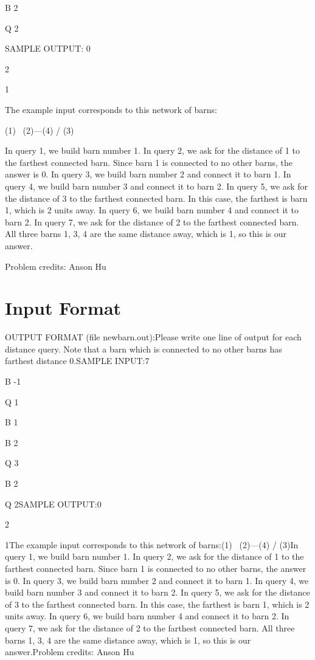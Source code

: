 \documentclass[12pt]{article}
\begin{document}
B 2

Q 2

SAMPLE OUTPUT: 
0

2

1


The example input corresponds to this network of barns:


  (1) 
    \   
     (2)---(4)
    /
  (3)

In query 1, we build barn number 1. In query 2, we ask for the distance of 1 to
the farthest connected barn. Since barn 1 is connected to no other barns, the
answer is 0. In query 3, we build barn number 2 and connect it to barn 1. In
query 4, we build barn number 3 and connect it to barn 2. In query 5, we ask for
the distance of 3 to the farthest connected barn. In this case, the farthest is
barn 1, which is 2 units away. In query 6, we build barn number 4 and connect it
to barn 2. In query 7, we ask for the distance of 2 to the farthest connected
barn. All three barns 1, 3, 4 are the same distance away, which is 1, so this is
our answer. 


Problem credits: Anson Hu



\section*{Input Format}
OUTPUT FORMAT (file newbarn.out):Please write one line of output for each distance query.  Note that a barn
which is connected to no other barns has farthest distance $0$.SAMPLE INPUT:7

B -1

Q 1

B 1

B 2

Q 3

B 2

Q 2SAMPLE OUTPUT:0

2

1The example input corresponds to this network of barns:(1) 
    \   
     (2)---(4)
    /
  (3)In query 1, we build barn number 1. In query 2, we ask for the distance of 1 to
the farthest connected barn. Since barn 1 is connected to no other barns, the
answer is 0. In query 3, we build barn number 2 and connect it to barn 1. In
query 4, we build barn number 3 and connect it to barn 2. In query 5, we ask for
the distance of 3 to the farthest connected barn. In this case, the farthest is
barn 1, which is 2 units away. In query 6, we build barn number 4 and connect it
to barn 2. In query 7, we ask for the distance of 2 to the farthest connected
barn. All three barns 1, 3, 4 are the same distance away, which is 1, so this is
our answer.Problem credits: Anson Hu
\end{document}
